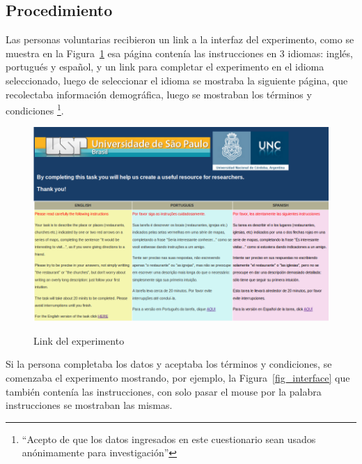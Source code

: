 \subsection{Procedimiento}
\label{corpus-metodo}

Las personas voluntarias recibieron un link a la interfaz del experimento, como se muestra en la Figura~\ref{fig_pagPrincipal_seleccion_idioma} esa p\'agina conten\'{i}a las instrucciones en 3 idiomas: ingl\'es, portugu\'es y espa\~{n}ol, y un link para completar el experimento en el idioma seleccionado, luego de seleccionar el idioma se mostraba la siguiente p\'agina, que recolectaba informaci\'on demogr\'afica, luego se mostraban los t\'erminos y condiciones \footnote{%
    ``Acepto de que los datos ingresados en este cuestionario sean usados an\'onimamente para investigaci\'on''
  }. 
\begin{figure}[ht]
\begin{center}
\includegraphics[width=17cm]{images/pagPrincipal.png}\\[0pt]
\caption{Link del experimento}
\label{fig_pagPrincipal_seleccion_idioma}
\end{center}
\end{figure}

Si la persona completaba los datos y aceptaba los t\'erminos y condiciones, se comenzaba el experimento mostrando, por ejemplo, la Figura~\ref{fig_interface} que tambi\'en conten\'{i}a las instrucciones, con solo pasar el mouse por la palabra instrucciones se mostraban las mismas.

